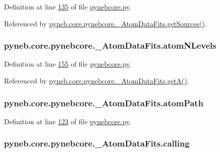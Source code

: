 Definition at line \hyperlink{pynebcore_8py_source_l00135}{135} of file \hyperlink{pynebcore_8py_source}{pynebcore.\-py}.



Referenced by \hyperlink{pynebcore_8py_source_l00190}{pyneb.\-core.\-pynebcore.\-\_\-\-Atom\-Data\-Fits.\-get\-Sources()}.

\hypertarget{classpyneb_1_1core_1_1pynebcore_1_1___atom_data_fits_a4ff73bfa251e1139692c2a60f9821315}{
\subsubsection[{atom\-N\-Levels}]{\setlength{\rightskip}{0pt plus 5cm}pyneb.\-core.\-pynebcore.\-\_\-\-Atom\-Data\-Fits.\-atom\-N\-Levels}}\label{classpyneb_1_1core_1_1pynebcore_1_1___atom_data_fits_a4ff73bfa251e1139692c2a60f9821315}


Definition at line \hyperlink{pynebcore_8py_source_l00155}{155} of file \hyperlink{pynebcore_8py_source}{pynebcore.\-py}.



Referenced by \hyperlink{pynebcore_8py_source_l00212}{pyneb.\-core.\-pynebcore.\-\_\-\-Atom\-Data\-Fits.\-get\-A()}.

\hypertarget{classpyneb_1_1core_1_1pynebcore_1_1___atom_data_fits_a2a9232b1a5ad60259d33d934e2cf5bf3}{
\subsubsection[{atom\-Path}]{\setlength{\rightskip}{0pt plus 5cm}pyneb.\-core.\-pynebcore.\-\_\-\-Atom\-Data\-Fits.\-atom\-Path}}\label{classpyneb_1_1core_1_1pynebcore_1_1___atom_data_fits_a2a9232b1a5ad60259d33d934e2cf5bf3}


Definition at line \hyperlink{pynebcore_8py_source_l00123}{123} of file \hyperlink{pynebcore_8py_source}{pynebcore.\-py}.

\hypertarget{classpyneb_1_1core_1_1pynebcore_1_1___atom_data_fits_a70465eedf1ac0b8e43360bc423be9c93}{
\subsubsection[{calling}]{\setlength{\rightskip}{0pt plus 5cm}pyneb.\-core.\-pynebcore.\-\_\-\-Atom\-Data\-Fits.\-calling}}\label{classpyneb_1_1core_1_1pynebcore_1_1___atom_data_fits_a70465eedf1ac0b8e43360bc423be9c93}


